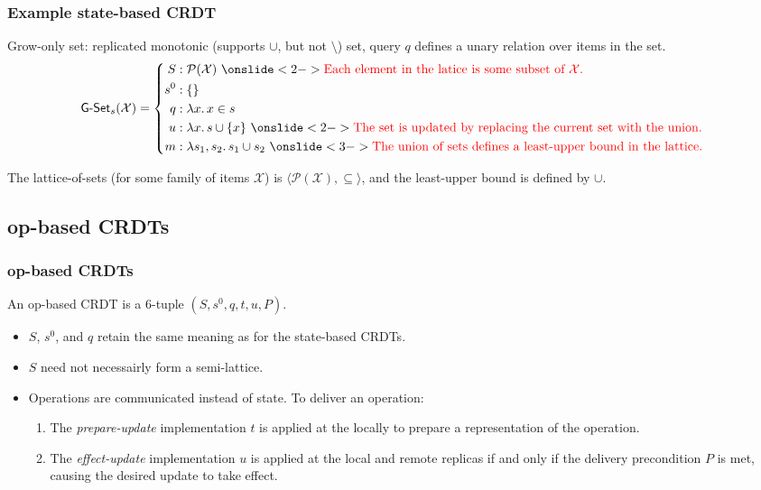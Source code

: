 \documentclass[aspectratio=169,compress,handout]{beamer}
\newcommand*{\CRDT}{\textsf{CRDT}\xspace}
\newcommand*{\CRDTs}{\textsf{CRDTs}\xspace}
\begin{document}
  \begin{frame}
    \frametitle{Example state-based \CRDT}

    Grow-only set: replicated monotonic (supports $\cup$, but not $\setminus$)
    set, query $q$ defines a unary relation over items in the set.
    \[
      \textsf{G-Set}_s(\mathcal{X}) = \left\{\begin{aligned}
        S &: \mathcal{P}(\mathcal{X})~\onslide<2->{\text{%
          \color{red}
          Each element in the latice is some subset of $\mathcal{X}$.
        }} \\
        s^0 &: \{ \} \\
        q &: \lambda x.\, x \in s \\
        u &: \lambda x.\, s \cup \{ x \}~\onslide<2->{\text{%
          \color{red}
          The set is updated by replacing the current set with the union.
        }} \\
        m &: \lambda s_1, s_2.\, s_1 \cup s_2~\onslide<3->{\text{%
          \color{red}
          The union of sets defines a least-upper bound in the lattice.
        }} \\
      \end{aligned}\right.
    \]

    \pause

    The lattice-of-sets (for some family of items $\mathcal{X}$) is
    $\langle \mathcal{P}(\mathcal{X}), \subseteq \rangle$, and the least-upper
    bound is defined by $\cup$.
  \end{frame}

  \subsection{op-based \CRDTs}
  \begin{frame}
    \frametitle{op-based \CRDTs}

    An op-based \CRDT is a $6$-tuple $(S, s^0, q, t, u, P)$.

    \begin{itemize}[<+->]
      \item $S$, $s^0$, and $q$ retain the same meaning as for the state-based
        \CRDTs.
      \item $S$ need not necessairly form a semi-lattice.
      \item Operations are communicated instead of state. To deliver an
        operation:
        \begin{enumerate}[<+->]
          \item The \textit{prepare-update} implementation $t$ is applied at the
            locally to prepare a representation of the operation.
          \item The \textit{effect-update} implementation $u$ is applied at the
            local and remote replicas if and only if the delivery precondition
            $P$ is met, causing the desired update to take effect.
        \end{enumerate}
    \end{itemize}
  \end{frame}
\end{document}
